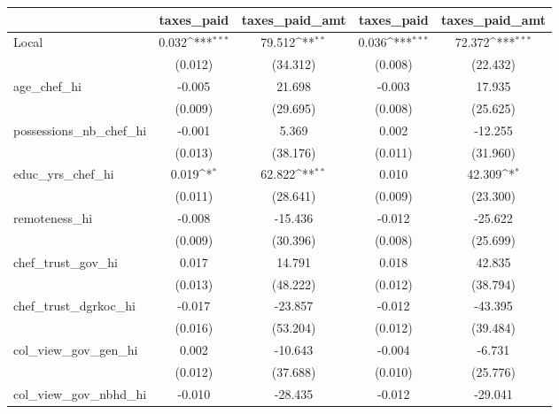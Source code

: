 {
\def\sym#1{\ifmmode^{#1}\else\(^{#1}\)\fi}
\begin{tabular}{l*{4}{c}}
\hline\hline
                &\multicolumn{1}{c}{taxes\_paid}&\multicolumn{1}{c}{taxes\_paid\_amt}&\multicolumn{1}{c}{taxes\_paid}&\multicolumn{1}{c}{taxes\_paid\_amt}\\
\hline
Local           &    0.032\sym{***}&   79.512\sym{**} &    0.036\sym{***}&   72.372\sym{***}\\
                &  (0.012)         & (34.312)         &  (0.008)         & (22.432)         \\
age\_chef\_hi     &   -0.005         &   21.698         &   -0.003         &   17.935         \\
                &  (0.009)         & (29.695)         &  (0.008)         & (25.625)         \\
possessions\_nb\_chef\_hi&   -0.001         &    5.369         &    0.002         &  -12.255         \\
                &  (0.013)         & (38.176)         &  (0.011)         & (31.960)         \\
educ\_yrs\_chef\_hi&    0.019\sym{*}  &   62.822\sym{**} &    0.010         &   42.309\sym{*}  \\
                &  (0.011)         & (28.641)         &  (0.009)         & (23.300)         \\
remoteness\_hi   &   -0.008         &  -15.436         &   -0.012         &  -25.622         \\
                &  (0.009)         & (30.396)         &  (0.008)         & (25.699)         \\
chef\_trust\_gov\_hi&    0.017         &   14.791         &    0.018         &   42.835         \\
                &  (0.013)         & (48.222)         &  (0.012)         & (38.794)         \\
chef\_trust\_dgrkoc\_hi&   -0.017         &  -23.857         &   -0.012         &  -43.395         \\
                &  (0.016)         & (53.204)         &  (0.012)         & (39.484)         \\
col\_view\_gov\_gen\_hi&    0.002         &  -10.643         &   -0.004         &   -6.731         \\
                &  (0.012)         & (37.688)         &  (0.010)         & (25.776)         \\
col\_view\_gov\_nbhd\_hi&   -0.010         &  -28.435         &   -0.012         &  -29.041         \\

\end{tabular}}
